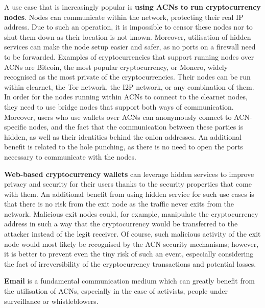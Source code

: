 A use case that is increasingly popular is \textbf{using ACNs to run cryptocurrency nodes}. Nodes can communicate within the network, protecting their real IP address. Due to such an operation, it is impossible to censor these nodes nor to shut them down as their location is not known. Moreover, utilisation of hidden services can make the node setup easier and safer, as no ports on a firewall need to be forwarded. Examples of cryptocurrencies that support running nodes over ACNs are Bitcoin, the most popular cryptocurrency, or Monero, widely recognised as the most private of the cryptocurrencies. Their nodes can be run within clearnet, the Tor network, the I2P network, or any combination of them. In order for the nodes running within ACNs to connect to the clearnet nodes, they need to use bridge nodes that support both ways of communication. Moreover, users who use wallets over ACNs can anonymously connect to ACN-specific nodes, and the fact that the communication between these parties is hidden, as well as their identities behind the onion addresses. An additional benefit is related to the hole punching, as there is no need to open the ports necessary to communicate with the nodes.

\textbf{Web-based cryptocurrency wallets} can leverage hidden services to improve privacy and security for their users thanks to the security properties that come with them. An additional benefit from using hidden service for such use cases is that there is no risk from the exit node as the traffic never exits from the network. Malicious exit nodes could, for example, manipulate the cryptocurrency address in such a way that the cryptocurrency would be transferred to the attacker instead of the legit receiver. Of course, such malicious activity of the exit node would most likely be recognised by the ACN security mechanisms; however, it is better to prevent even the tiny risk of such an event, especially considering the fact of irreversibility of the cryptocurrency transactions and potential losses.

\textbf{Email} is a fundamental communication medium which can greatly benefit from the utilisation of ACNs, especially in the case of activists, people under surveillance or whistleblowers.

